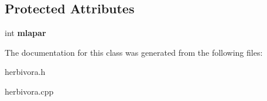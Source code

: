 \subsection*{Protected Attributes}
\begin{DoxyCompactItemize}
\item 
int {\bfseries mlapar}\hypertarget{classherbivora_aaec5704f5e23be6e458aabf3029b11e3}{}\label{classherbivora_aaec5704f5e23be6e458aabf3029b11e3}

\end{DoxyCompactItemize}


The documentation for this class was generated from the following files\+:\begin{DoxyCompactItemize}
\item 
herbivora.\+h\item 
herbivora.\+cpp\end{DoxyCompactItemize}
